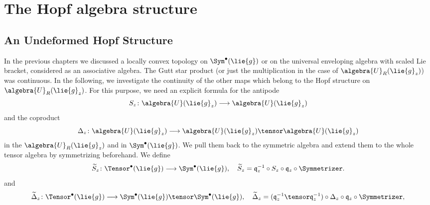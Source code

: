 
%
%

\chapter{The Hopf algebra structure}

\section{An Undeformed Hopf Structure}

In the previous chapters we discussed a locally convex topology on $\Sym^{\bullet}
(\lie{g})$ or on the universal enveloping algebra with scaled Lie bracket, 
considered as an associative algebra. The Gutt star product (or just the 
multiplication in the case of $\algebra{U}_R(\lie{g}_z)$) was continuous.
In the following, we investigate the continuity of the other maps which belong to 
the Hopf structure on $\algebra{U}_R(\lie{g}_z)$. For this purpose, we need an 
explicit formula for the antipode
\begin{equation}
    \label{eq:Antipode}
    S_z \colon
    \algebra{U}(\lie{g}_z)
    \longrightarrow
    \algebra{U}(\lie{g}_z)
\end{equation}
and the coproduct
\begin{equation}
    \label{eq:CoProduct}
    \coproduct_z \colon
    \algebra{U}(\lie{g}_z)
    \longrightarrow
    \algebra{U}(\lie{g}_z)
    \tensor
    \algebra{U}(\lie{g}_z)
\end{equation}
in the $\algebra{U}_R(\lie{g}_z)$ and in $\Sym^{\bullet}(\lie{g})$. We pull them 
back to the symmetric algebra and extend them to the whole tensor algebra by 
symmetrizing beforehand. We define
\begin{equation}
    \label{eq:AntipodeOnTensor}
    \widetilde{S}_z \colon
    \Tensor^\bullet(\lie{g})
    \longrightarrow
    \Sym^\bullet(\lie{g})
    , \quad
    \widetilde{S}_z
    =
    \mathfrak{q}_z^{-1}
    \circ
    S_z
    \circ
    \mathfrak{q}_z
    \circ
    \Symmetrizer.
\end{equation}
and
\begin{equation}
    \label{eq:CoProductOnTensor}
    \widetilde{\ocoproduct}_z \colon
    \Tensor^\bullet(\lie{g})
    \longrightarrow
    \Sym^\bullet(\lie{g})
    \tensor
    \Sym^\bullet(\lie{g})
    , \quad
    \widetilde{\ocoproduct}_z
    =
    (\mathfrak{q}_z^{-1} \tensor \mathfrak{q}_z^{-1})
    \circ
    \coproduct_z
    \circ
    \mathfrak{q}_z
    \circ
    \Symmetrizer,
\end{equation}
